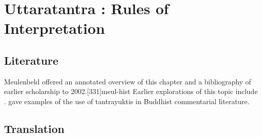 
\chapter{Uttaratantra :  Rules of Interpretation}

\section{Literature} 

Meulenbeld offered an annotated overview of this chapter and a bibliography
of earlier scholarship to 2002.[331]{meul-hist}  Earlier explorations 
of this topic include \cite{dasg-1952,
    lele-1981,
    mejo-2000,
    nara-1949,
    ober-1967,
    scha-1993,
    sing-2003,
    muth-1976}. 
\citet{mane-2008} gave examples of the use of tantrayuktis in Buddhist 
commentarial literature.

\section{Translation}

